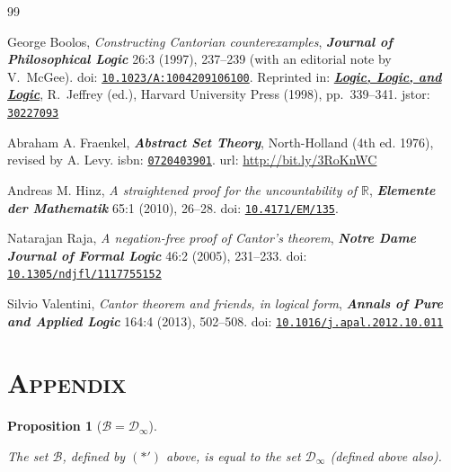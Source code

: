 \documentclass[12pt]{article}
\newtheorem{proposition}[theorem]{Proposition}
\begin{document}
\begin{thebibliography}{99}



{\sc George Boolos}, {\em Constructing Cantorian counterexamples}, \textbf{\textit{Journal of  Philosophical Logic}}   26:3 (1997),  237--239 (with an editorial note by  V.~McGee).
{\sc doi}: \href{https://doi.org/10.1023/A:1004209106100}{\tt 10.1023/A:1004209106100}.
Reprinted in:
\href{https://www.hup.harvard.edu/books/9780674537675}{\textbf{\textit{Logic, Logic, and Logic}}},  R.~Jeffrey (ed.), Harvard University Press (1998), pp.~339--341.
{\sc jstor}: \href{https://www.jstor.org/stable/30227093}{\tt 30227093}

{\sc Abraham A. Fraenkel},  \textbf{\textit{Abstract Set Theory}}, North-Holland  (4th ed. 1976), revised by {\sc A. Levy}.
{\sc isbn}: \href{https://isbnsearch.org/isbn/0720403901}{\tt 0720403901}.  {\sc url}: \url{http://bit.ly/3RoKnWC}


{\sc Andreas M. Hinz}, {\em A straightened proof for the uncountability of  $\mathbb{R}$},
\textbf{\textit{Elemente der Mathematik}} 65:1 (2010), 26--28. %
{\sc doi}: \href{https://doi.org/10.4171/EM/135}{\tt 10.4171/EM/135}.

{\sc Natarajan Raja}, {\em A negation-free proof of Cantor's theorem}, \textbf{\textit{Notre Dame Journal of  Formal  Logic}} 46:2 (2005), 231--233.
{\sc doi}: \href{https://doi.org/10.1305/ndjfl/1117755152}{\tt 10.1305/ndjfl/1117755152}


{\sc Silvio Valentini}, {\em Cantor theorem and friends, in logical form},  \textbf{\textit{Annals of Pure and Applied Logic}} 164:4 (2013), 502--508.  {\sc doi}: \href{https://doi.org/10.1016/j.apal.2012.10.011}{\tt 10.1016/j.apal.2012.10.011}
\end{thebibliography}



\appendix
\section*{\textsc{Appendix}}

\begin{proposition}[$\mathcal{B}=\mathcal{D}_\infty$]
\,

\noindent
The set $\mathcal{B}$, defined by $(\boldsymbol\ast')$ above, is equal to the set $\mathcal{D}_\infty$ (defined above also).
\end{proposition}
\end{document}
